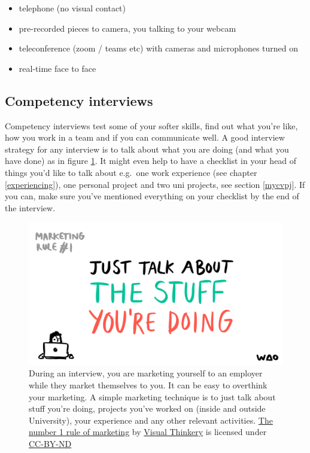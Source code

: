 \documentclass[
]{book}
\providecommand{\tightlist}{%
  \setlength{\itemsep}{0pt}\setlength{\parskip}{0pt}}
\begin{document}
\begin{itemize}
\tightlist
\item
  telephone (no visual contact)
\item
  pre-recorded pieces to camera, you talking to your webcam
\item
  teleconference (zoom / teams etc) with cameras and microphones turned on
\item
  real-time face to face
\end{itemize}

\hypertarget{hrinterview}{%
\subsection{Competency interviews}\label{hrinterview}}

Competency interviews test some of your softer skills, find out what you're like, how you work in a team and if you can communicate well. A good interview strategy for any interview is to talk about what you are doing (and what you have done) as in figure \ref{fig:overthinking-fig}. It might even help to have a checklist in your head of things you'd like to talk about e.g.~one work experience (see chapter \ref{experiencing}), one personal project and two uni projects, see section \ref{mycvpj}. If you can, make sure you've mentioned everything on your checklist by the end of the interview.

\begin{figure}

{\centering \includegraphics[width=0.99\linewidth]{images/Marketing-rule-No1} 

}

\caption{During an interview, you are marketing yourself to an employer while they market themselves to you. It can be easy to overthink your marketing. A simple marketing technique is to just talk about stuff you're doing, projects you've worked on (inside and outside University), your experience and any other relevant activities. \href{https://bryanmmathers.com/the-1-rule-of-marketing/}{The number 1 rule of marketing} by \href{https://visualthinkery.com/}{Visual Thinkery} is licensed under \href{https://creativecommons.org/licenses/by-nd/4.0/}{CC-BY-ND}}\label{fig:overthinking-fig}
\end{figure}
\end{document}
